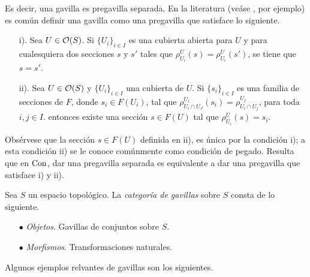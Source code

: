 Es decir, una gavilla es pregavilla separada. En la literatura (veáse \cite{tennison1975sheaf}, por ejemplo) es común definir una gavilla como una pregavilla que satisface lo siguiente.
    \begin{enumerate}
        \item[i).] Sea $U\in{\mathcal O}(S)$. Si $\{U_i\}_{i\in I}$ es una cubierta abierta para $U$ y para cualesquiera dos secciones $s$ y $s'$ tales que $\rho^U_{U_i}(s)=\rho^U_{U_i}(s')$, se tiene que $s=s'$.
        \item[ii).] Sea $U\in{\mathcal O}(S)$ y $\{U_i\}_{i\in I}$ una cubierta de $U$. Si $\{s_i\}_{i\in I}$ es una familia de secciones de $F$, donde $s_i\in F(U_i)$, tal que  $\rho^{U_i}_{U_i\cap U_J}(s_i)=\rho^{U_j}_{U_i\cap U_j}$, para toda $i,j\in I$. entonces existe una sección $s\in F(U)$ tal que $\rho^U_{U_i}(s)=s_i$.
    \end{enumerate}
Obsérvese que la sección $s\in F(U)$ definida en ii), es única por la condición i); a esta condición ii) se le conoce comúnmente como condición de pegado. Resulta que en ${\mathrm{Con}}$, dar una pregavilla separada es equivalente a dar una pregavilla que satisface i) y ii).
\begin{definition}
    Sea $S$ un espacio topológico. La \emph{categoría de gavillas} sobre $S$ consta de lo siguiente.
    \begin{enumerate}
        \item[$\bullet$] \emph{Objetos}. Gavillas de conjuntos sobre $S$.
        \item[$\bullet$] \emph{Morfismos}. Transformaciones naturales.
    \end{enumerate}
\end{definition}
Algunos ejemplos relvantes de gavillas son los siguientes.
